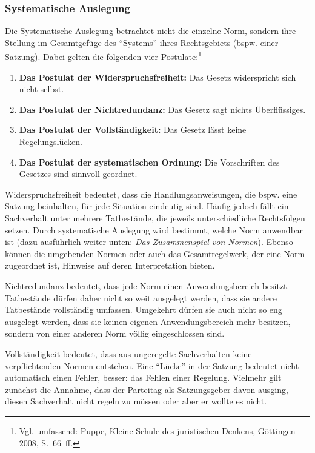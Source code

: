 \subsubsection{Systematische Auslegung}
Die Systematische Auslegung betrachtet nicht die einzelne Norm, sondern ihre Stellung im Gesamtgefüge des \enquote{Systems} ihres Rechtsgebiets (bspw. einer Satzung). Dabei gelten die folgenden vier Postulate:\footnote{Vgl. umfassend: Puppe, Kleine Schule des juristischen Denkens, Göttingen 2008, S.~66~ff.}
\begin{enumerate}
\item \textbf{Das Postulat der Widerspruchsfreiheit:} Das Gesetz widerspricht sich nicht selbst.
\item \textbf{Das Postulat der Nichtredundanz:} Das Gesetz sagt nichts Überflüssiges.
\item \textbf{Das Postulat der Vollständigkeit:} Das Gesetz lässt keine Regelungslücken.
\item \textbf{Das Postulat der systematischen Ordnung:} Die Vorschriften des Gesetzes sind sinnvoll geordnet.
\end{enumerate}

Widerspruchsfreiheit bedeutet, dass die Handlungsanweisungen, die bspw. eine Satzung beinhalten, für jede Situation eindeutig sind. Häufig jedoch fällt ein Sachverhalt unter mehrere Tatbestände, die jeweils unterschiedliche Rechtsfolgen setzen. Durch systematische Auslegung wird bestimmt, welche Norm anwendbar ist (dazu ausführlich weiter unten: \emph{Das Zusammenspiel von Normen}). Ebenso können die umgebenden Normen oder auch das Gesamtregelwerk, der eine Norm zugeordnet ist, Hinweise auf deren Interpretation bieten.

Nichtredundanz bedeutet, dass jede Norm einen Anwendungsbereich besitzt. Tatbestände dürfen daher nicht so weit ausgelegt werden, dass sie andere Tatbestände vollständig umfassen. Umgekehrt dürfen sie auch nicht so eng ausgelegt werden, dass sie keinen eigenen Anwendungsbereich mehr besitzen, sondern von einer anderen Norm völlig eingeschlossen sind.

Vollständigkeit bedeutet, dass aus ungeregelte Sachverhalten keine verpflichtenden Normen entstehen. Eine \enquote{Lücke} in der Satzung bedeutet nicht automatisch einen Fehler, besser: das Fehlen einer Regelung. Vielmehr gilt zunächst die Annahme, dass der Parteitag als Satzungsgeber davon ausging, diesen Sachverhalt nicht regeln zu müssen oder aber er wollte es nicht.

